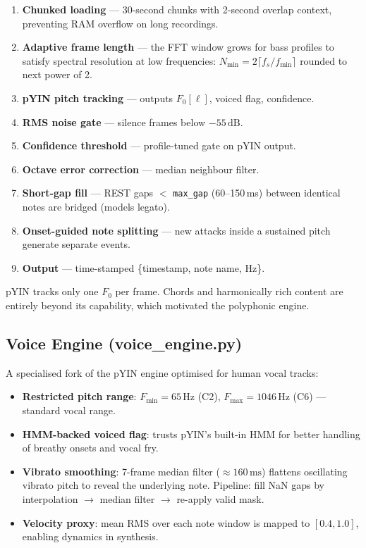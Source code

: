 \documentclass[12pt, a4paper]{article}
\begin{document}
\begin{enumerate}[leftmargin=2em]
  \item \textbf{Chunked loading} --- 30-second chunks with 2-second overlap
        context, preventing RAM overflow on long recordings.
  \item \textbf{Adaptive frame length} --- the FFT window grows for bass
        profiles to satisfy spectral resolution at low frequencies:
        $N_{\min} = 2\lceil f_s / f_{\min}\rceil$ rounded to next power of 2.
  \item \textbf{pYIN pitch tracking} --- outputs $F_0[\ell]$, voiced flag, confidence.
  \item \textbf{RMS noise gate} --- silence frames below $-55\,\text{dB}$.
  \item \textbf{Confidence threshold} --- profile-tuned gate on pYIN output.
  \item \textbf{Octave error correction} --- median neighbour filter.
  \item \textbf{Short-gap fill} --- REST gaps $<$ \texttt{max\_gap}
        (60--150\,ms) between identical notes are bridged (models legato).
  \item \textbf{Onset-guided note splitting} --- new attacks inside a
        sustained pitch generate separate events.
  \item \textbf{Output} --- time-stamped \{timestamp, note name, Hz\}.
\end{enumerate}

\begin{notebox}[Limitation]
  pYIN tracks only one $F_0$ per frame. Chords and harmonically rich content
  are entirely beyond its capability, which motivated the polyphonic engine.
\end{notebox}

\subsection{Voice Engine (voice\_engine.py)}

A specialised fork of the pYIN engine optimised for human vocal tracks:
\begin{itemize}[leftmargin=2em]
  \item \textbf{Restricted pitch range}: $F_{\min} = 65\,\text{Hz}$ (C2),
        $F_{\max} = 1046\,\text{Hz}$ (C6) --- standard vocal range.
  \item \textbf{HMM-backed voiced flag}: trusts pYIN's built-in HMM for
        better handling of breathy onsets and vocal fry.
  \item \textbf{Vibrato smoothing}: 7-frame median filter ($\approx 160\,\text{ms}$)
        flattens oscillating vibrato pitch to reveal the underlying note.
        Pipeline: fill NaN gaps by interpolation $\to$ median filter $\to$
        re-apply valid mask.
  \item \textbf{Velocity proxy}: mean RMS over each note window is mapped to
        $[0.4, 1.0]$, enabling dynamics in synthesis.
\end{itemize}
\end{document}
